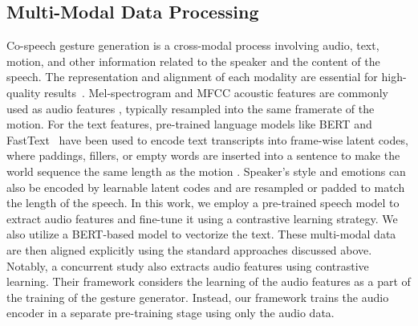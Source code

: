\subsection{Multi-Modal Data Processing}
Co-speech gesture generation is a cross-modal process involving audio, text, motion, and other information related to the speaker and the content of the speech. The representation and alignment of each modality are essential for high-quality results~\cite{8269806}. Mel-spectrogram and MFCC acoustic features are commonly used as audio features \cite{alexanderson2020style, qian2021speech, kucherenko2020gesticulator}, typically resampled into the same framerate of the motion. For the text features, pre-trained language models like BERT \cite{devlin2019bert,kucherenko2020gesticulator} and FastText~\cite{bojanowski2017enriching,yoon2020speech} have been used to encode text transcripts into frame-wise latent codes, where paddings, fillers, or empty words are inserted into a sentence to make the world sequence the same length as the motion \cite{kucherenko2020gesticulator, yoon2020speech}. Speaker's style and emotions can also be encoded by learnable latent codes \cite{bhattacharya2021speech2affectivegestures,yoon2020speech} and are resampled or padded to match the length of the speech. In this work, we employ a pre-trained speech model to extract audio features and fine-tune it using a contrastive learning strategy. We also utilize a BERT-based model to vectorize the text. These multi-modal data are then aligned explicitly using the standard approaches discussed above. Notably, a concurrent study \cite{liu2022learning} also extracts audio features using contrastive learning. Their framework considers the learning of the audio features as a part of the training of the gesture generator. Instead, our framework trains the audio encoder in a separate pre-training stage using only the audio data.

